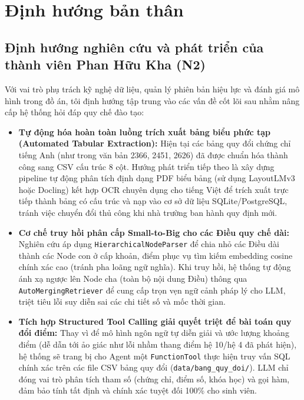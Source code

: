 \section{Định hướng bản thân}

\subsection{Định hướng nghiên cứu và phát triển của thành viên Phan Hữu Kha (N2)}

Với vai trò phụ trách kỹ nghệ dữ liệu, quản lý phiên bản hiệu lực và đánh giá mô hình trong đồ án, tôi định hướng tập trung vào các vấn đề cốt lõi sau nhằm nâng cấp hệ thống hỏi đáp quy chế đào tạo:

\begin{itemize}
  \item \textbf{Tự động hóa hoàn toàn luồng trích xuất bảng biểu phức tạp (Automated Tabular Extraction):}
        Hiện tại các bảng quy đổi chứng chỉ tiếng Anh (như trong văn bản 2366, 2451, 2626) đã được chuẩn hóa thành công sang CSV cấu trúc 8 cột. Hướng phát triển tiếp theo là xây dựng pipeline tự động phân tích định dạng PDF biểu bảng (sử dụng LayoutLMv3 hoặc Docling) kết hợp OCR chuyên dụng cho tiếng Việt để trích xuất trực tiếp thành bảng có cấu trúc và nạp vào cơ sở dữ liệu SQLite/PostgreSQL, tránh việc chuyển đổi thủ công khi nhà trường ban hành quy định mới.
  \item \textbf{Cơ chế truy hồi phân cấp Small-to-Big cho các Điều quy chế dài:}
        Nghiên cứu áp dụng \texttt{HierarchicalNodeParser} để chia nhỏ các Điều dài thành các Node con ở cấp khoản, điểm phục vụ tìm kiếm embedding cosine chính xác cao (tránh pha loãng ngữ nghĩa). Khi truy hồi, hệ thống tự động ánh xạ ngược lên Node cha (toàn bộ nội dung Điều) thông qua \texttt{AutoMergingRetriever} để cung cấp trọn vẹn ngữ cảnh pháp lý cho LLM, triệt tiêu lỗi suy diễn sai các chi tiết số và mốc thời gian.
  \item \textbf{Tích hợp Structured Tool Calling giải quyết triệt để bài toán quy đổi điểm:}
        Thay vì để mô hình ngôn ngữ tự diễn giải và ước lượng khoảng điểm (dễ dẫn tới ảo giác như lỗi nhầm thang điểm hệ 10/hệ 4 đã phát hiện), hệ thống sẽ trang bị cho Agent một \texttt{FunctionTool} thực hiện truy vấn SQL chính xác trên các file CSV bảng quy đổi (\texttt{data/bang\_quy\_doi/}). LLM chỉ đóng vai trò phân tích tham số (chứng chỉ, điểm số, khóa học) và gọi hàm, đảm bảo tính tất định và chính xác tuyệt đối 100\% cho sinh viên.
\end{itemize}

